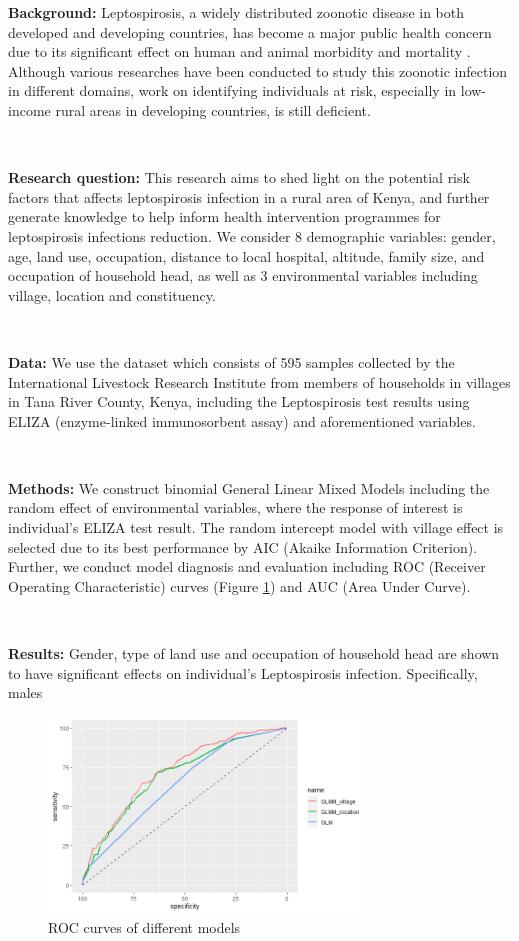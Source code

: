 \documentclass[11pt,twoside]{article}
\numberwithin{Theorem}{section}
\numberwithin{Definition}{section}
\numberwithin{Lemma}{section}
\numberwithin{Algorithm}{section}
\numberwithin{equation}{section}
\begin{document}
\textbf{Background:} Leptospirosis, a widely distributed zoonotic disease in both developed and developing countries, has become a major public health concern due to its significant effect on human and animal morbidity and mortality \cite{haake2015leptospirosis}. Although various researches have been conducted to study this zoonotic infection in different domains, work on identifying individuals at risk, especially in low-income rural areas in developing countries, is still deficient.

\

\textbf{Research question:} This research aims to shed light on the potential risk factors that affects leptospirosis infection in a rural area of Kenya, and further generate knowledge to help inform health intervention programmes for leptospirosis infections reduction. We consider 8 demographic variables: gender, age, land use, occupation, distance to local hospital, altitude, family size, and occupation of household head, as well as 3 environmental variables including village, location and constituency.

\

\textbf{Data:} We use the dataset which consists of 595 samples collected by the International Livestock Research Institute from members of households in villages in Tana River County, Kenya, including the Leptospirosis test results using ELIZA (enzyme-linked immunosorbent assay) and aforementioned variables.


\

\textbf{Methods:} We construct binomial General Linear Mixed Models including the random effect of environmental variables, where the response of interest is individual's ELIZA test result. The random intercept model with village effect is selected due to its best performance by AIC (Akaike Information Criterion). Further, we conduct model diagnosis and evaluation including ROC (Receiver Operating Characteristic) curves (Figure \ref{fig:ROC}) and AUC (Area Under Curve).

\

\textbf{Results:} Gender, type of land use and occupation of household head are shown to have significant effects on individual's Leptospirosis infection. Specifically, males

\begin{figure}[!h]
	\centering
	\includegraphics[width = 0.75\textwidth]{Images/ROC.png}
	\caption{ROC curves of different models}
	\label{fig:ROC}
\end{figure}
\end{document}

